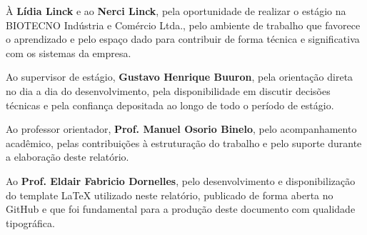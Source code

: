 \documentclass[
    12pt,               %
    oneside,            %
    a4paper,            %
    chapter=TITLE,      %
    section=TITLE,      %
    english,            %
    brazil              %
]{abntex2}
\begin{document}

\frenchspacing


\pretextual

\imprimircapa

\imprimirfolhaderosto

%     

\imprimirfolhadabanca

\begin{agradecimentos}
À \textbf{Lídia Linck} e ao \textbf{Nerci Linck}, pela oportunidade de realizar o estágio na
BIOTECNO Indústria e Comércio Ltda., pelo ambiente de trabalho que favorece o aprendizado e
pelo espaço dado para contribuir de forma técnica e significativa com os sistemas da
empresa.

Ao supervisor de estágio, \textbf{Gustavo Henrique Buuron}, pela orientação direta no
dia a dia do desenvolvimento, pela disponibilidade em discutir decisões técnicas e pela confiança
depositada ao longo de todo o período de estágio.

Ao professor orientador, \textbf{Prof. Manuel Osorio Binelo}, pelo acompanhamento acadêmico,
pelas contribuições à estruturação do trabalho e pelo suporte durante a elaboração deste relatório.

Ao \textbf{Prof. Eldair Fabricio Dornelles}, pelo desenvolvimento e disponibilização do template
\LaTeX{} utilizado neste relatório, publicado de forma aberta no GitHub e que foi fundamental
para a produção deste documento com qualidade tipográfica.
\end{agradecimentos}

\end{document}
